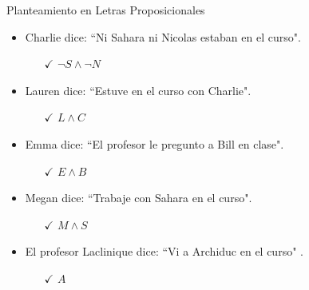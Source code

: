\documentclass[10pt]{beamer}
\begin{document}
\begin{frame}[fragile]{Planteamiento en Letras Proposicionales}
    \begin{itemize}
    	\item Charlie dice: \textquotedblleft Ni Sahara ni Nicolas estaban en el curso".
    	\begin{itemize}
    		\item [$\checkmark$]  $ \neg S \land \neg N $ 
    	\end{itemize}    
    	\item Lauren dice: \textquotedblleft Estuve en el curso con Charlie".
    	\begin{itemize}
    		\item [$\checkmark$] $ L \land C $ 
    	\end{itemize}
    	\item Emma dice: \textquotedblleft El profesor le pregunto a Bill en clase".
    	\begin{itemize}
    		\item [$\checkmark$]  $ E \land B $ 
    	\end{itemize}
    	\item Megan dice: \textquotedblleft Trabaje con Sahara en el curso".
    	\begin{itemize}
    		\item [$\checkmark$]  $ M \land S $ 
    	\end{itemize}
    	\item El profesor Laclinique dice: \textquotedblleft Vi a Archiduc en el curso" .
    	\begin{itemize}
    		\item [$\checkmark$]  $ A $
    	\end{itemize}
       
    \end{itemize}
\end{frame}
\end{document}
